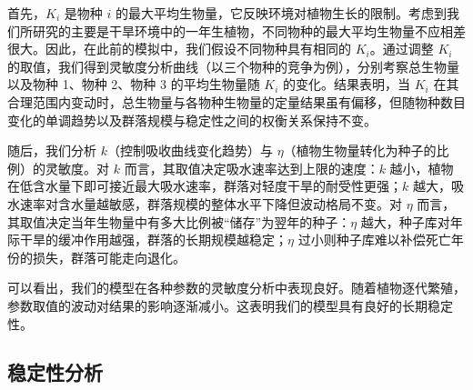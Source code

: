 \documentclass[11pt,a4paper]{ctexart}
\begin{document}
首先，$K_i$ 是物种 $i$ 的最大平均生物量，它反映环境对植物生长的限制。考虑到我们所研究的主要是干旱环境中的一年生植物，不同物种的最大平均生物量不应相差很大。因此，在此前的模拟中，我们假设不同物种具有相同的 $K_i$。通过调整 $K_i$ 的取值，我们得到灵敏度分析曲线（以三个物种的竞争为例），分别考察总生物量以及物种 1、物种 2、物种 3 的平均生物量随 $K_i$ 的变化。结果表明，当 $K_i$ 在其合理范围内变动时，总生物量与各物种生物量的定量结果虽有偏移，但随物种数目变化的单调趋势以及群落规模与稳定性之间的权衡关系保持不变。

随后，我们分析 $k$（控制吸收曲线变化趋势）与 $\eta$（植物生物量转化为种子的比例）的灵敏度。对 $k$ 而言，其取值决定吸水速率达到上限的速度：$k$ 越小，植物在低含水量下即可接近最大吸水速率，群落对轻度干旱的耐受性更强；$k$ 越大，吸水速率对含水量越敏感，群落规模的整体水平下降但波动格局不变。对 $\eta$ 而言，其取值决定当年生物量中有多大比例被“储存”为翌年的种子：$\eta$ 越大，种子库对年际干旱的缓冲作用越强，群落的长期规模越稳定；$\eta$ 过小则种子库难以补偿死亡年份的损失，群落可能走向退化。

可以看出，我们的模型在各种参数的灵敏度分析中表现良好。随着植物逐代繁殖，参数取值的波动对结果的影响逐渐减小。这表明我们的模型具有良好的长期稳定性。

\subsection{稳定性分析}
\end{document}
